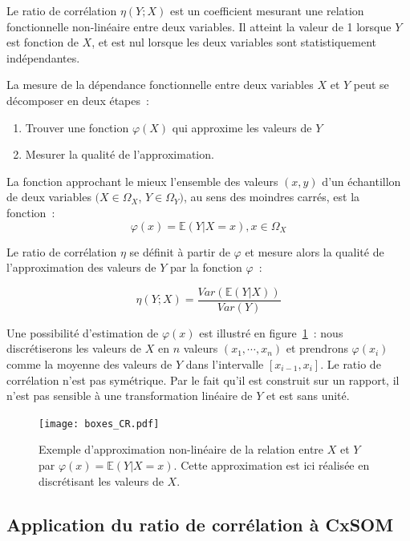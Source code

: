 \documentclass[../main]{subfiles}
\begin{document}
Le ratio de corrélation $\eta(Y;X)$ est un coefficient mesurant une relation fonctionnelle non-linéaire entre deux variables. Il atteint la valeur de 1 lorsque $Y$ est fonction de $X$, et est nul lorsque les deux variables sont statistiquement indépendantes.

La mesure de la dépendance fonctionnelle entre deux variables $X$ et $Y$ peut se décomposer en deux étapes~:
\begin{enumerate}
    \item Trouver une fonction $\varphi(X)$ qui approxime les valeurs de $Y$
    \item Mesurer la qualité de l'approximation.
\end{enumerate}

La fonction approchant le mieux l'ensemble des valeurs $(x,y)$ d'un échantillon de deux variables $(X \in \Omega_X$, $Y \in \Omega_Y)$, au sens des moindres carrés, est la fonction~:
\begin{equation}
    \varphi(x) = \mathbb{E}(Y|X = x), x \in \Omega_X
\end{equation}

Le ratio de corrélation $\eta$ se définit à partir de $\varphi$ et mesure alors la qualité de l'approximation des valeurs de $Y$ par la fonction $\varphi$~:

\begin{equation}\label{eq:cr}
   \eta(Y;X) = \frac{Var(\mathbb{E}(Y|X))}{Var(Y)}
\end{equation}

Une possibilité d'estimation de $\varphi(x)$ est illustré en figure~\ref{fig:cr_box}~: nous discrétiserons les valeurs de $X$ en $n$ valeurs $(x_1, \cdots, x_n)$ et prendrons $\varphi(x_i)$ comme la moyenne des valeurs de $Y$ dans l'intervalle $[x_{i-1}, x_i]$.
Le ratio de corrélation n'est pas symétrique. Par le fait qu'il est construit sur un rapport, il n'est pas sensible à une transformation linéaire de $Y$ et est sans unité.

\begin{figure}
    \centering
    \texttt{[image: boxes\_CR.pdf]}
    \caption{Exemple d'approximation non-linéaire de la relation entre $X$ et $Y$ par $\varphi(x)= \mathbb{E}(Y|X=x)$. Cette approximation est ici réalisée en discrétisant les valeurs de $X$. \label{fig:cr_box}}
\end{figure}

\subsection{Application du ratio de corrélation à CxSOM}
\end{document}
